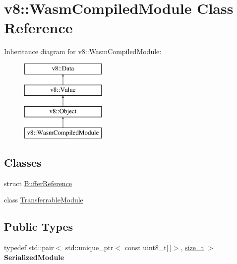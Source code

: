 \hypertarget{classv8_1_1WasmCompiledModule}{}\section{v8\+:\+:Wasm\+Compiled\+Module Class Reference}
\label{classv8_1_1WasmCompiledModule}
Inheritance diagram for v8\+:\+:Wasm\+Compiled\+Module\+:\begin{figure}[H]
\begin{center}
\leavevmode
\includegraphics[height=4.000000cm]{classv8_1_1WasmCompiledModule}
\end{center}
\end{figure}
\subsection*{Classes}
\begin{DoxyCompactItemize}
\item 
struct \mbox{\hyperlink{structv8_1_1WasmCompiledModule_1_1BufferReference}{Buffer\+Reference}}
\item 
class \mbox{\hyperlink{classv8_1_1WasmCompiledModule_1_1TransferrableModule}{Transferrable\+Module}}
\end{DoxyCompactItemize}
\subsection*{Public Types}
\begin{DoxyCompactItemize}
\item 
\mbox{\label{classv8_1_1WasmCompiledModule_af5ba87d6a6d78c06360c753001417f57}} 
typedef std\+::pair$<$ std\+::unique\+\_\+ptr$<$ const uint8\+\_\+t\mbox{[}$\,$\mbox{]}$>$, \mbox{\hyperlink{classsize__t}{size\+\_\+t}} $>$ {\bfseries Serialized\+Module}
\end{DoxyCompactItemize}
